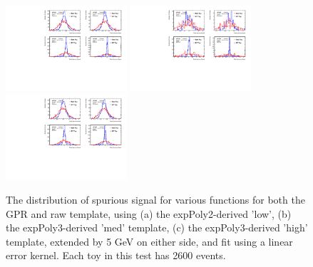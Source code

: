 \begin{figure} 
\begin{center}
  \includegraphics[width=0.4\textwidth]{figures/background/gpr/validation/linear/ToyTest_FitSigVals_lowpT_2600_noSig}   
  \includegraphics[width=0.4\textwidth]{figures/background/gpr/validation/linear/ToyTest_FitSigVals_medpT_2600_noSig}   
  \includegraphics[width=0.4\textwidth]{figures/background/gpr/validation/linear/ToyTest_FitSigVals_highpT_2600_noSig}   
\caption{The distribution of spurious signal for various functions for both the GPR and raw template, using (a) the expPoly2-derived 'low', (b) the expPoly3-derived 'med' template, (c) the expPoly3-derived 'high' template, extended by 5 GeV on either side, and fit using a linear error kernel. Each toy in this test has 2600 events.}
\label{fig:linearkernel_lowpt_2600_noSig}
\end{center}
\end{figure}


